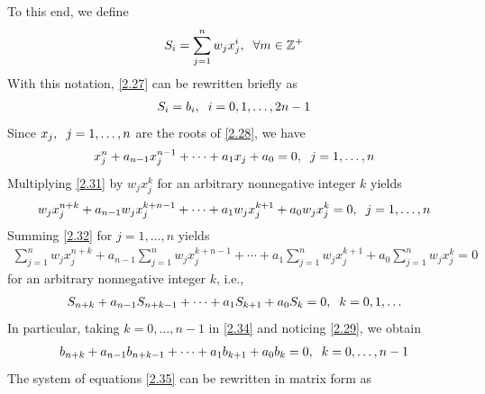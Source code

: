 \documentclass[a4paper]{article}
\numberwithin{equation}{section}
\begin{document}
To this end, we define
\begin{align}
\label{2.29}
{S_i} = \sum\limits_{j = 1}^n {{w_j}x_j^i} ,\hspace{0.2cm}\forall m \in {\mathbb{Z}^ + }
\end{align}
With this notation, \eqref{2.27} can be rewritten briefly as
\begin{align}
{S_i} = {b_i},\hspace{0.2cm}i = 0,1, \ldots ,2n - 1
\end{align}
Since $x_j,\hspace{0.2cm}j=1,\ldots,n$ are the roots of \eqref{2.28}, we have
\begin{align}
\label{2.31}
x_j^n + {a_{n - 1}}x_j^{n - 1} +  \cdots  + {a_1}{x_j} + {a_0} = 0,\hspace{0.2cm}j = 1, \ldots ,n
\end{align}
Multiplying \eqref{2.31} by ${w_j}x_j^k$ for an arbitrary nonnegative integer $k$ yields
\begin{align}
\label{2.32}
{w_j}x_j^{n + k} + {a_{n - 1}}{w_j}x_j^{k + n - 1} +  \cdots  + {a_1}{w_j}x_j^{k + 1} + {a_0}{w_j}x_j^k = 0,\hspace{0.2cm}j = 1, \ldots ,n
\end{align}
Summing \eqref{2.32} for $j=1,\ldots,n$ yields
\begin{align}
\sum\limits_{j = 1}^n {{w_j}x_j^{n + k}}  + {a_{n - 1}}\sum\limits_{j = 1}^n {{w_j}x_j^{k + n - 1}}  +  \cdots  + {a_1}\sum\limits_{j = 1}^n {{w_j}x_j^{k + 1}}  + {a_0}\sum\limits_{j = 1}^n {{w_j}x_j^k}  = 0
\end{align}
for an arbitrary nonnegative integer $k$, i.e.,
\begin{align}
\label{2.34}
{S_{n + k}} + {a_{n - 1}}{S_{n + k - 1}} +  \cdots  + {a_1}{S_{k + 1}} + {a_0}{S_k} = 0,\hspace{0.2cm}k = 0,1, \ldots 
\end{align}
In particular, taking $k=0,\ldots,n-1$ in \eqref{2.34} and noticing \eqref{2.29}, we obtain
\begin{align}
\label{2.35}
{b_{n + k}} + {a_{n - 1}}{b_{n + k - 1}} +  \cdots  + {a_1}{b_{k + 1}} + {a_0}{b_k} = 0,\hspace{0.2cm}k = 0, \ldots ,n - 1
\end{align}
The system of equations \eqref{2.35} can be rewritten in matrix form as
\end{document}
